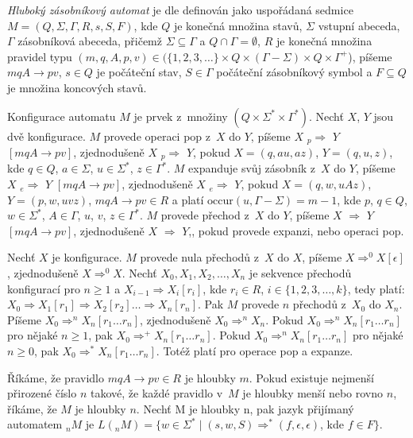 \begin{Def} \label{def_deep_pda}
\emph{Hluboký zásobníkový automat} je dle \cite{Meduna:DeepPDA} definován jako uspořádaná sedmice $M = (Q,\Sigma,\Gamma, R, s, S, F)$, kde 
  $Q$ je konečná množina stavů, 
  $\Sigma$ vstupní abeceda, 
  $\Gamma$ zásobníková abeceda, přičemž $\Sigma \subseteq \Gamma$ a $Q \cap \Gamma = \emptyset$,
  $R$ je konečná množina pravidel typu $(m, q, A, p, v) \in (\{1,2,3,\dots\} \times Q \times (\Gamma-\Sigma)\times   Q \times {\Gamma}^+$), píšeme $mqA \rightarrow pv$,
  $s \in Q$ je počáteční stav, 
  $S \in \Gamma$ počáteční zásobníkový symbol a 
  $F \subseteq Q$ je množina koncových stavů.

Konfigurace automatu $M$ je prvek z~množiny $(Q \times \Sigma^* \times \Gamma^*)$. 
Nechť $X$, $Y$ jsou dvě konfigurace. 
$M$ provede operaci pop z~$X$ do $Y$, píšeme $X$  ${}_p{\Rightarrow}$  $Y$ $[mqA \rightarrow pv]$, zjednodušeně $X$  ${}_p{\Rightarrow}$  $Y$, pokud $X = (q, au, az)$, $Y = (q, u, z)$, kde $q \in Q$, $a \in \Sigma$, $u \in \Sigma^*$, $z \in \Gamma^*$.  
$M$ expanduje svůj zásobník z~$X$ do $Y$, píšeme $X$  ${}_e{\Rightarrow}$  $Y$ $[mqA \rightarrow pv]$, zjednodušeně $X$  ${}_e{\Rightarrow}$  $Y$, pokud $X = (q, w, uAz)$, $Y = (p, w, uvz)$, $mqA \rightarrow pv \in R$ a platí $\mathrm{occur}(u,\Gamma - \Sigma) = m - 1 $, kde $p$, $q \in Q$, $w \in \Sigma^*$, $A \in \Gamma$, $u$, $v$, $z \in \Gamma^*$. 
$M$ provede přechod z~$X$ do $Y$, píšeme $X$  ${\Rightarrow}$  $Y$ $[mqA \rightarrow pv]$, zjednodušeně $X$  ${\Rightarrow}$  $Y$,, pokud provede expanzi, nebo operaci pop.

Nechť $X$ je konfigurace. $M$ provede nula přechodů z~$X$ do $X$, píšeme $X \Rightarrow^0 X [\epsilon]$, zjednodušeně $X \Rightarrow^0 X$. Nechť $X_0, X_1, X_2,\dots,X_n $ je sekvence přechodů konfigurací pro $n \ge 1$  a $X_{i-1} \Rightarrow X_i [r_i]$, kde $r_i \in R$, $i \in \{1, 2, 3,\dots, k\}$, tedy platí: $X_0 \Rightarrow X_1 [r_1] \Rightarrow X_2 [r_2] \dots \Rightarrow X_n [r_n]$. Pak $M$ provede $n$ přechodů z~$X_0$ do $X_n$. Píšeme $X_{0} \Rightarrow^n X_n [r_1 \dots r_n]$, zjednodušeně $X_{0} \Rightarrow^n X_n$. Pokud $X_{0} \Rightarrow^n X_n [r_1 \dots r_n]$ pro nějaké $n \ge 1$, pak $X_{0} \Rightarrow^+ X_n [r_1 \dots r_n]$. Pokud $X_{0} \Rightarrow^n X_n [r_1 \dots r_n]$ pro nějaké $n \ge 0$, pak $X_{0} \Rightarrow^* X_n [r_1 \dots r_n]$. Totéž platí pro operace pop a expanze.

Říkáme, že pravidlo $mqA \rightarrow pv \in R$ je hloubky $m$. Pokud existuje nejmenší přirozené číslo $n$ takové, že každé pravidlo v~$M$ je hloubky menší nebo rovno $n$, říkáme, že $M$ je hloubky $n$. Nechť M je hloubky n, pak jazyk přijímaný automatem ${}_nM$ je $L({}_nM) = \{ w \in \Sigma^* \mid (s,w,S) \Rightarrow^* (f, \epsilon, \epsilon)$, kde $f \in F \}$.


\end{Def}

